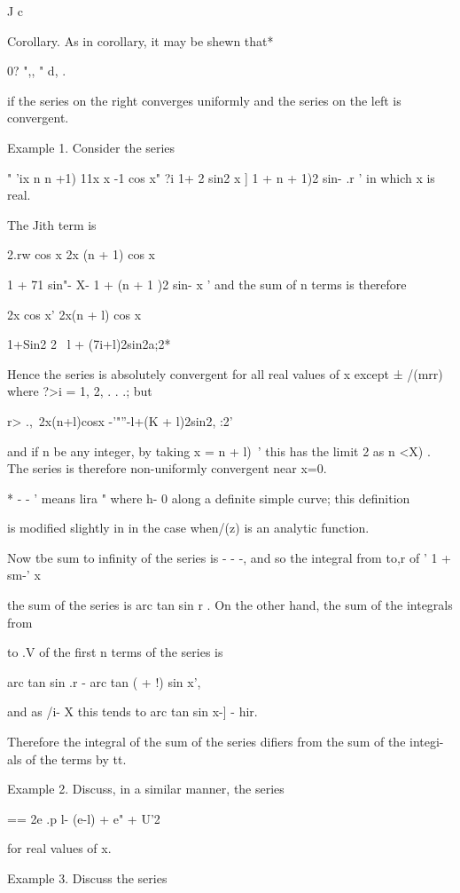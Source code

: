 J c

Corollary. As in corollary, it may be shewn that*

0? ",, " d, .

if the series on the right converges uniformly and the series on the
left is convergent.

Example 1. Consider the series

" 'ix n n +1) 11x x -1 cos x" ?i 1+ 2 sin2 x ] 1 + n + 1)2 sin- .r '
in which x is real.

The Jith term is

2.rw cos x 2x (n + 1) cos x

1 + 71 sin"- X- 1 + (n + 1 )2 sin- x ' and the sum of n terms is
therefore

2x cos x' 2x(n + l) cos x

1+Sin2 2~ l + (7i+l)2sin2a;2*

Hence the series is absolutely convergent for all real values of x
except ± /(mrr) where ?>i = 1, 2, . . .; but

r> .,\ 2x(n+l)cosx -'"''-l+(K + l)2sin2, :2'

and if n be any integer, by taking x = n + l)~' this has the limit 2
as n <X) . The series is therefore non-uniformly convergent near x=0.

* - - ' means lira " where h- 0 along a definite simple curve; this
definition

is modified slightly in in the case when/(z) is an analytic
function.

%
%

Now tbe sum to infinity of the series is - - -, and so the integral
from to,r of ' 1 + sm-' x

the sum of the series is arc tan sin r . On the other hand, the sum of
the integrals from

to .V of the first n terms of the series is

arc tan sin .r - arc tan ( + !) sin x',

and as /i- X this tends to arc tan sin x-] - hir.

Therefore the integral of the sum of the series difiers from the sum
of the integi-als of the terms by tt.

Example 2. Discuss, in a similar manner, the series

== 2e .p l- (e-l) + e" + U'2

for real values of x.

Example 3. Discuss the series

